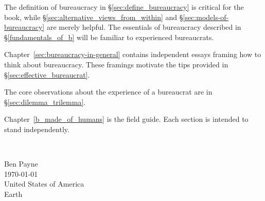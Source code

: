 The definition of bureaucracy in \S\ref{sec:define_bureaucracy} is critical for the book, while \S\ref{sec:alternative_views_from_within} and \S\ref{sec:models-of-bureaucracy} are merely helpful. The essentials of bureaucracy described in \S\ref{fundamentals_of_b} will be familiar to experienced bureaucrats. 

Chapter~\ref{sec:bureaucracy-in-general} contains independent essays framing how to think about bureaucracy. 
These framings motivate the tips provided in \S\ref{sec:effective_bureaucrat}.

The core observations about the experience of a bureaucrat are in \S\ref{sec:dilemma_trilemma}. 

Chapter~\ref{b_made_of_humans} is the field guide. Each section is intended to stand independently. %

\ \\

\begin{flushright}
Ben Payne\\
\today\\
United States of America\\
Earth
\end{flushright}


